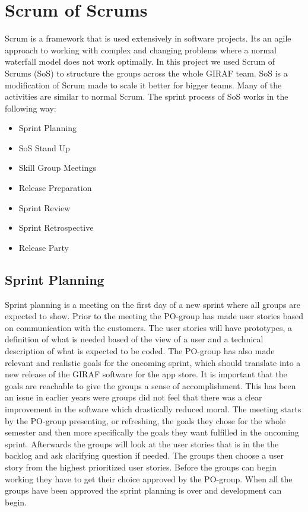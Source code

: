 \section{Scrum of Scrums}
Scrum is a framework that is used extensively in software projects.
Its an agile approach to working with complex and changing problems where a normal waterfall model does not work optimally.
In this project we used Scrum of Scrums (SoS) to structure the groups across the whole GIRAF team.
SoS is a modification of Scrum made to scale it better for bigger teams.
Many of the activities are similar to normal Scrum.
The sprint process of SoS works in the following way:

\begin{itemize}
    \item Sprint Planning
    \item SoS Stand Up
    \item Skill Group Meetings
    \item Release Preparation
    \item Sprint Review
    \item Sprint Retrospective
    \item Release Party
\end{itemize}

\subsection{Sprint Planning}
Sprint planning is a meeting on the first day of a new sprint where all groups are expected to show. Prior to the meeting the PO-group has made user stories based on communication with the customers.
The user stories will have prototypes, a definition of what is needed based of the view of a user and a technical description of what is expected to be coded.
\newline
\newline
The PO-group has also made relevant and realistic goals for the oncoming sprint, which should translate into a new release of the GIRAF software for the app store.
It is important that the goals are reachable to give the groups a sense of accomplishment.
This has been an issue in earlier years were groups did not feel that there was a clear improvement in the software which drastically reduced moral.
\newline
\newline
The meeting starts by the PO-group presenting, or refreshing, the goals they chose for the whole semester and then more specifically the goals they want fulfilled in the oncoming sprint.
Afterwards the groups will look at the user stories that is in the the backlog and ask clarifying question if needed.
\newline
\newline
The groups then choose a user story from the highest prioritized user stories.
Before the groups can begin working they have to get their choice approved by the PO-group.
When all the groups have been approved the sprint planning is over and development can begin.

